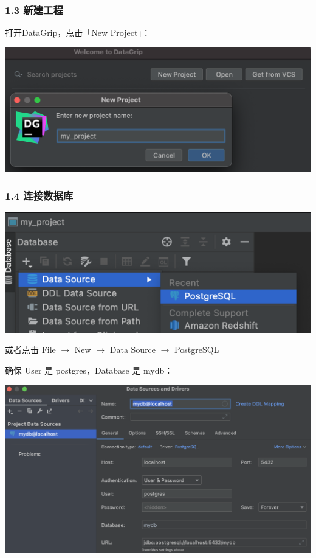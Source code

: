 \documentclass[aspectratio=169, 14pt]{beamer}
\begin{document}
\begin{frame}
    \frametitle{1.3 新建工程}
打开DataGrip，点击「New Project」：

\includegraphics[width=.8\textwidth]{week4/welcome}

\end{frame}

\begin{frame}
    \frametitle{1.4 连接数据库} 
    \includegraphics[width=.8\textwidth]{week4/datasource}

    或者点击 File $\rightarrow$ New $\rightarrow$ Data Source $\rightarrow$ PostgreSQL

\end{frame}

\begin{frame}
确保 User 是 \alert{postgres}，Database 是 \alert{mydb}：

\includegraphics[width=.8\textwidth]{week4/config}

\end{frame}
\end{document}
